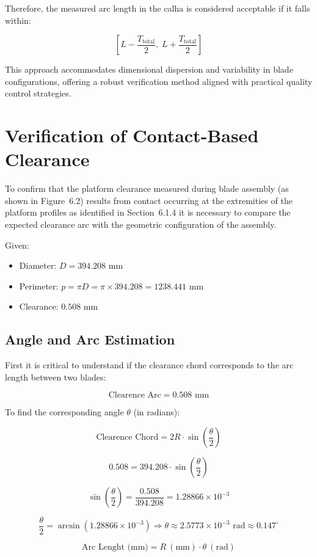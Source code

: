 Therefore, the measured arc length in the calha is considered acceptable if it falls within:

\[
[L - \frac{T_{\text{total}}}{2} , \; L + \frac{T_{\text{total}}}{2}]
\]

This approach accommodates dimensional dispersion and variability in blade configurations, offering a robust verification method aligned with practical quality control strategies.


\section{Verification of Contact-Based Clearance}

To confirm that the platform clearance measured during blade assembly (as shown in Figure~6.2) results from contact occurring at the extremities of the platform profiles as identified in Section~6.1.4 it is necessary to compare the expected clearance arc with the geometric configuration of the assembly.

Given:
\begin{itemize}
    \item Diameter: $D = 394.208$ mm
    \item Perimeter: $p = \pi D = \pi \times 394.208 = 1238.441$ mm
    \item Clearance: $0.508$ mm
\end{itemize}

\subsection*{Angle and Arc Estimation}

First it is critical to understand if the clearance chord corresponds to the arc length between two blades:

\[
\text{Clearence Arc} = 0.508 \text{ mm}
\]

To find the corresponding angle $\theta$ (in radians):

\[
\text{Clearence Chord} = 2R \cdot \sin\left(\frac{\theta}{2}\right)
\]


\[
0.508 = 394.208 \cdot \sin\left(\frac{\theta}{2}\right)
\]

\[
\sin\left(\frac{\theta}{2}\right) = \frac{0.508}{394.208} = 1.28866 \times 10^{-3}
\]

\[
\frac{\theta}{2} = \arcsin(1.28866 \times 10^{-3}) \Rightarrow \theta \approx 2.5773 \times 10^{-3} \text{ rad} \approx 0.147^\circ
\]

\[
\text{Arc Lenght (mm)} = R~(\text{mm}) \cdot \theta~(\text{rad})
\]

